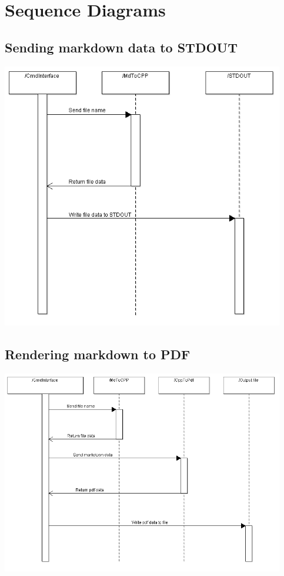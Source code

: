 \section{Sequence Diagrams}

\subsection{Sending markdown data to STDOUT}
\noindent\includegraphics[width=350pt]{images/mdOutput_smaller.png}

\subsection{Rendering markdown to PDF}
\noindent\includegraphics[width=350pt]{images/mdToPdf_smaller.png}

